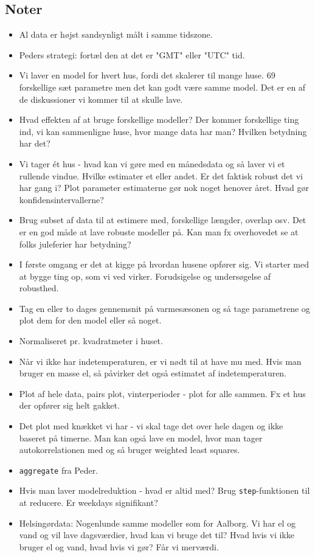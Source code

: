 \subsection{Noter}
\begin{itemize}
    \item Al data er højst sandsynligt målt i samme tidszone. 
    \item Peders strategi: fortæl den at det er "GMT" eller "UTC" tid.
    \item Vi laver en model for hvert hus, fordi det skalerer til mange huse. 69 forskellige sæt parametre men det kan godt være samme model. Det er en af de diskussioner vi kommer til at skulle lave.  
    \item Hvad effekten af at bruge forskellige modeller? Der kommer forskellige ting ind, vi kan sammenligne huse, hvor mange data har man? Hvilken betydning har det? 
    \item Vi tager ét hus - hvad kan vi gøre med en månedsdata og så laver vi et rullende vindue. Hvilke estimater et eller andet. Er det faktisk robust det vi har gang i? Plot parameter estimaterne gør nok noget henover året. Hvad gør konfidensintervallerne? 
    \item Brug subset af data til at estimere med, forskellige længder, overlap osv. Det er en god måde at lave robuste modeller på. Kan man fx overhovedet se at folks juleferier har betydning? 
    \item I første omgang er det at kigge på hvordan husene opfører sig. Vi starter med at bygge ting op, som vi ved virker. Forudsigelse og undersøgelse af robusthed. 
    \item Tag en eller to dages gennemsnit på varmesæsonen og så tage parametrene og plot dem for den model eller så noget. 
    \item Normaliseret pr. kvadratmeter i huset. 
    \item Når vi ikke har indetemperaturen, er vi nødt til at have mu med. Hvis man bruger en masse el, så påvirker det også estimatet af indetemperaturen. 
    \item Plot af hele data, pairs plot, vinterperioder - plot for alle sammen. Fx et hus der opfører sig helt gakket. 
    \item Det plot med knækket vi har - vi skal tage det over hele dagen og ikke baseret på timerne. Man kan også lave en model, hvor man tager autokorrelationen med og så bruger weighted least squares. 
    \item \texttt{aggregate} fra Peder.
    \item Hvis man laver modelreduktion - hvad er altid med? Brug \texttt{step}-funktionen til at reducere. Er weekdays signifikant? 
    \item Helsingørdata: Nogenlunde samme modeller som for Aalborg. Vi har el og vand og vil lave dagsværdier, hvad kan vi bruge det til? Hvad hvis vi ikke bruger el og vand, hvad hvis vi gør? Får vi merværdi. 
\end{itemize}

